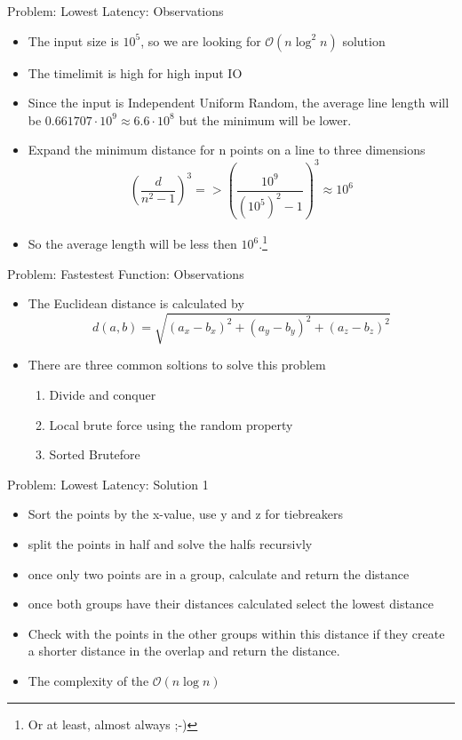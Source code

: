 \documentclass[11pt,pdf, aspectratio=169]{beamer}
\begin{document}
  \begin{frame}{Problem: Lowest Latency: Observations}
    \begin{itemize}
      \item The input size is $10^5$, so we are looking for $\mathcal{O}(n \log^2 n)$ solution
      \item The timelimit is high for high input IO
      \item Since the input is Independent Uniform Random, the average line length will be $0.661707\cdot 10^9 \approx 6.6\cdot 10^8 $ but the minimum will be lower.
      \item Expand the minimum distance for n points on a line to three dimensions \\
      \[
        \left( \frac{d}{n^2-1} \right)^3 => \left(\frac{10^9}{(10^5)^2-1}\right)^3 \approx 10^6
      \]
      \item So the average length will be less then $10^6$.\footnote{ Or at least, almost always ;-)}
    \end{itemize}
  \end{frame}
  \begin{frame}{Problem: Fastestest Function: Observations}
    \begin{itemize}
      \item The Euclidean distance is calculated by \\
      \[ d(a,b) = \sqrt {(a_x - b_x)^2 + (a_y - b_y)^2 + (a_z-b_z)^2}\]
      \item There are three common soltions to solve this problem
      \begin{enumerate}
        \item Divide and conquer
        \item Local brute force using the random property
        \item Sorted Brutefore
      \end{enumerate}
    \end{itemize}
  \end{frame}
  \begin{frame}{Problem: Lowest Latency: Solution 1}
    \begin{itemize}
      \item Sort the points by the x-value, use y and z for tiebreakers
      \item split the points in half and solve the halfs recursivly
      \item once only two points are in a group, calculate and return the distance
      \item once both groups have their distances calculated select the lowest distance
      \item Check with the points in the other groups within this distance if they create a shorter distance in the overlap and return the distance.
      \item The complexity of the $\mathcal{O}(n \log n)$
    \end{itemize}
  \end{frame}
\end{document}
